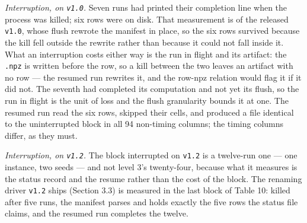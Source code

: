 \documentclass[acmsmall,screen,review]{acmart}
\begin{document}
\textit{Interruption, on \texttt{v1.0}.} Seven runs had printed their completion line when the process was killed; six rows were on disk. That measurement is of the released \texttt{v1.0}, whose flush rewrote the manifest in place, so the six rows survived because the kill fell outside the rewrite rather than because it could not fall inside it. What an interruption costs either way is the run in flight and its artifact: the \texttt{.npz} is written before the row, so a kill between the two leaves an artifact with no row --- the resumed run rewrites it, and the row-npz relation would flag it if it did not. The seventh had completed its computation and not yet its flush, so the run in flight is the unit of loss and the flush granularity bounds it at one. The resumed run read the six rows, skipped their cells, and produced a file identical to the uninterrupted block in all 94 non-timing columns; the timing columns differ, as they must.


\textit{Interruption, on \texttt{v1.2}.} The block interrupted on \texttt{v1.2} is a twelve-run one --- one instance, two seeds --- and not level 3's twenty-four, because what it measures is the status record and the resume rather than the cost of the block. The renaming driver \texttt{v1.2} ships (Section 3.3) is measured in the last block of Table 10: killed after five runs, the manifest parses and holds exactly the five rows the status file claims, and the resumed run completes the twelve.
\end{document}
